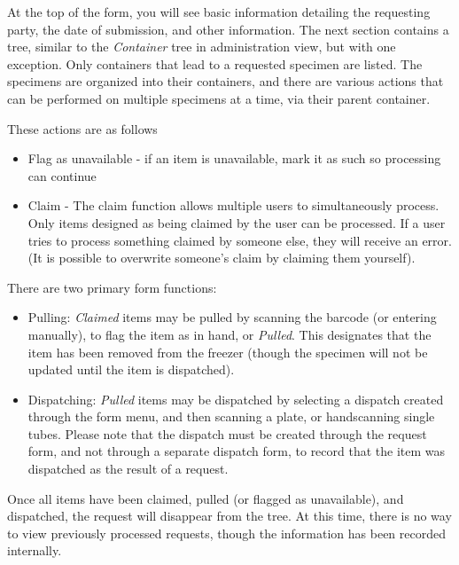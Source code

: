 At the top of the form, you will see basic information detailing the requesting party, the date of submission, and other information.  The next section contains a tree, similar to the \emph{Container} tree in administration view, but with one exception. Only containers that lead to a requested specimen are listed.  The specimens are organized into their containers, and there are various actions that can be performed on multiple specimens at a time, via their parent container.  
      
These actions are as follows
\begin{itemize}
\item Flag as unavailable - if an item is unavailable, mark it as such so processing can continue
\item Claim - The claim function allows multiple users to simultaneously process.  Only items designed as being claimed by the user can be processed.  If a user tries to process something claimed by someone else, they will receive an error. (It is possible to overwrite someone's claim by claiming them yourself).
\end{itemize}
 
There are two primary form functions:
\begin{itemize}
\item Pulling:  \emph{Claimed} items may be pulled by scanning the barcode (or entering manually), to flag the item as in hand, or \emph{Pulled}.  This designates that the item has been removed from the freezer (though the specimen will not be updated until the item is dispatched).  
\item Dispatching: \emph{Pulled} items may be dispatched by selecting a dispatch created through the form menu, and then scanning a plate, or handscanning single tubes. Please note that the dispatch must be created through the request form, and not through a separate dispatch form, to record that the item was dispatched as the result of a request.  
\end{itemize}
 
Once all items have been claimed, pulled (or flagged as unavailable), and dispatched, the request will disappear from the tree.  At this time, there is no way to view previously processed requests, though the information has been recorded internally.

